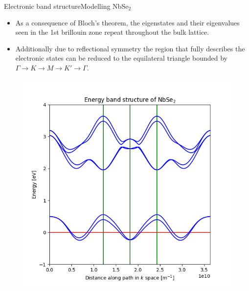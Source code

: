 \documentclass[9pt]{beamer}
\begin{document}
\begin{frame}{Electronic band structure}{Modelling NbSe$_2$}
  \begin{itemize}
    \item As a consequence of Bloch's theorem, the eigenstates and their eigenvalues seen in the 1st brillouin zone repeat throughout the bulk lattice. 

    \item Additionally due to reflectional symmetry the region that fully describes the electronic states can be reduced to the equilateral triangle bounded by $\Gamma \rightarrow K \rightarrow M \rightarrow K' \rightarrow \Gamma$.
  \end{itemize}

  \begin{figure}
  \centering
  \begin{minipage}{.5\textwidth}
    \centering
    \includegraphics[width=.9\linewidth]{unrotated_evalues.png}
  \end{minipage}%
  \begin{minipage}{.5\textwidth}
    \centering

\end{minipage}
\end{figure}
\end{frame}
\end{document}
